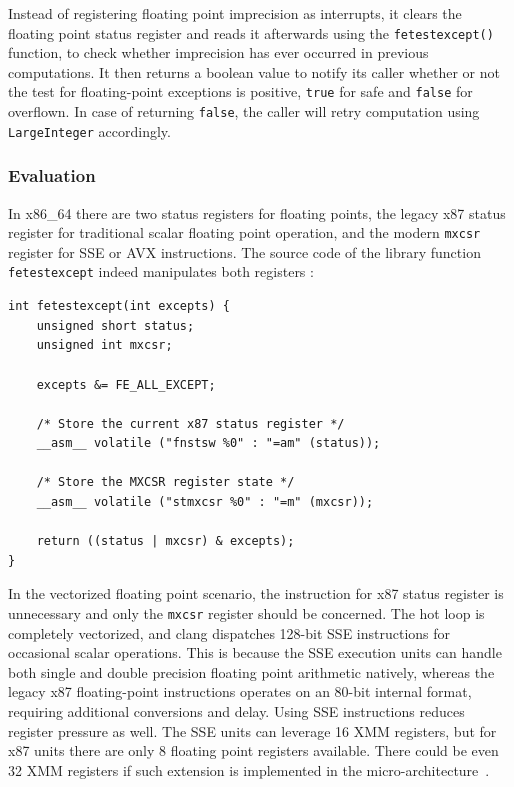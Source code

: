 \documentclass[logo,bsc,singlespacing,parskip]{infthesis}
\newcommand{\mxcsr}{\texttt{mxcsr} }
\begin{document}
Instead of registering floating point imprecision as interrupts, it clears the
floating point status register and reads it afterwards using the
\texttt{fetestexcept()} function, to check whether imprecision has ever occurred
in previous computations. It then returns a boolean value to notify its caller
whether or not the test for floating-point exceptions is positive, \texttt{true}
for safe and \texttt{false} for overflown. In case of returning \texttt{false}, 
the caller will retry computation using \texttt{LargeInteger} accordingly. 



\subsubsection{Evaluation}
In x86\_64 there are two status registers for floating points, the legacy x87
status register for traditional scalar floating point operation, and the modern
\mxcsr register for SSE or AVX instructions. The source code of the library
function \texttt{fetestexcept} indeed manipulates both registers \cite{fenvlib}: 
\begin{verbatim}
int fetestexcept(int excepts) {
    unsigned short status;
    unsigned int mxcsr;

    excepts &= FE_ALL_EXCEPT;

    /* Store the current x87 status register */
    __asm__ volatile ("fnstsw %0" : "=am" (status));

    /* Store the MXCSR register state */
    __asm__ volatile ("stmxcsr %0" : "=m" (mxcsr));

    return ((status | mxcsr) & excepts);
}
\end{verbatim}


In the vectorized floating point scenario, the instruction for x87 status
register is unnecessary and only the \mxcsr register should be concerned. The
hot loop is completely vectorized, and clang dispatches 128-bit SSE instructions
for occasional scalar operations. This is because the SSE execution units can
handle both single and double precision floating point arithmetic natively,
whereas the legacy x87 floating-point instructions operates on an 80-bit
internal format, requiring additional conversions and delay. Using SSE
instructions reduces register pressure as well. The SSE units can leverage 16
XMM registers, but for x87 units there are only 8 floating point registers
available. There could be even 32 XMM registers if such extension is implemented
in the micro-architecture~\cite{x87-bad}. 
\end{document}
